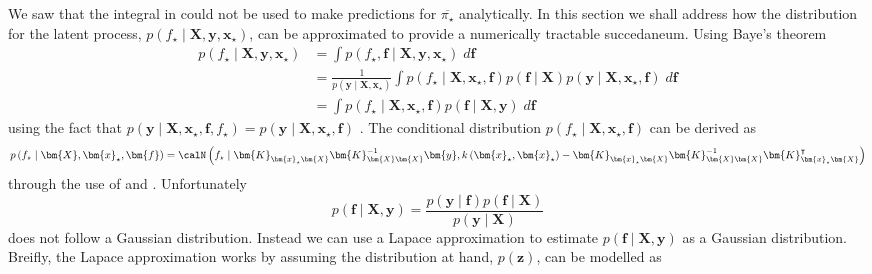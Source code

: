 We saw that the integral in   could not be used to make predictions for $\overline{\pi_{\star}}$ analytically. In this section we shall address how the distribution for the latent process, $p \left( f_{\star} \mid \bm{X} , \bm{y} , \bm{x}_{\star} \right)$, can be approximated to provide a numerically tractable succedaneum. Using Baye's theorem
\begin{align*}
    p \left( f_{\star} \mid \bm{X} , \bm{y} , \bm{x}_{\star} \right)
     & = \int p \left( f_{\star} , \bm{f} \mid \bm{X} , \bm{y} , \bm{x}_{\star} \right) \; d \bm{f}                                                                                                                                                       \\
     & = \frac{1}{p \left( \bm{y} \mid \bm{X} , \bm{x}_{\star} \right)} \int p \left( f_{\star} \mid \bm{X} , \bm{x}_{\star}, \bm{f} \right) p \left( \bm{f} \mid \bm{X} \right) p \left( \bm{y} \mid \bm{X} , \bm{x}_{\star}, \bm{f} \right) \; d \bm{f} \\
     & = \int p \left( f_{\star} \mid \bm{X} , \bm{x}_{\star}, \bm{f} \right) p \left( \bm{f} \mid \bm{X} , \bm{y} \right) \; d \bm{f}
\end{align*}
using the fact that $p \left( \bm{y} \mid \bm{X} , \bm{x}_{\star}, \bm{f}, f_{\star} \right) = p \left( \bm{y} \mid \bm{X} , \bm{x}_{\star}, \bm{f} \right)$ \cite{BishopChristopherM2006Pram, RasmussenCarlEdward2006Gpfm}. The conditional distribution $p \left( f_{\star} \mid \bm{X} , \bm{x}_{\star}, \bm{f} \right)$ can be derived as
\begin{equation*}
    p \left( f_{\star} \mid \bm{X} , \bm{x}_{\star}, \bm{f} \right) = \calN \left( f_{\star} \mid \bm{K}_{\bm{x}_{\star}\bm{X}} \bm{K}_{\bm{X} \bm{X}}^{-1} \bm{y}, k \left( \bm{x}_{\star}, \bm{x}_{\star} \right) - \bm{K}_{\bm{x}_{\star}\bm{X}} \bm{K}_{\bm{X} \bm{X}}^{-1} \bm{K}_{\bm{x}_{\star} \bm{X}}^{\intercal} \right)
\end{equation*}
through the use of  and . Unfortunately
\begin{equation*}
    p \left( \bm{f} \mid \bm{X} , \bm{y} \right) = \frac{p \left( \bm{y} \mid \bm{f} \right) p \left( \bm{f} \mid \bm{X} \right) }{p \left( \bm{y} \mid \bm{X} \right)}
\end{equation*}
does not follow a Gaussian distribution. Instead we can use a Lapace approximation to estimate $p \left( \bm{f} \mid \bm{X} , \bm{y} \right)$ as a Gaussian distribution. Breifly, the Lapace approximation works by assuming the distribution at hand, $p \left( \bm{z} \right)$, can be modelled as
